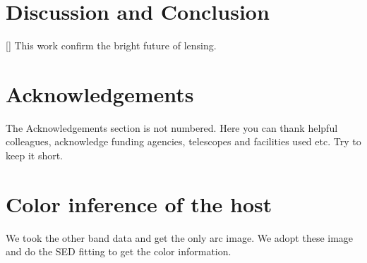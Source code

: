 \documentclass[fleqn,usenatbib]{mnras}
\begin{document}
\section{Discussion and Conclusion}
[] This work confirm the bright future of lensing.



\section*{Acknowledgements}

The Acknowledgements section is not numbered. Here you can thank helpful
colleagues, acknowledge funding agencies, telescopes and facilities used etc.
Try to keep it short.










\appendix

\section{Color inference of the host}
We took the other band data and get the only arc image. We adopt these image and do the SED fitting to get the color information.



\bsp	%
\label{lastpage}
\end{document}
